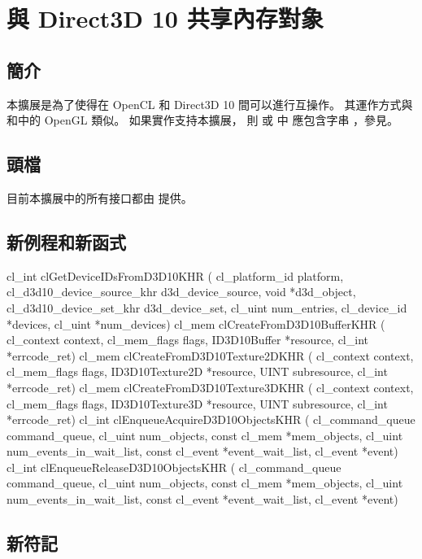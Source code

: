 \section{與 Direct3D 10 共享內存對象}

\subsection{簡介}

本擴展是為了使得在 OpenCL 和 Direct3D 10 間可以進行互操作。
其運作方式與\insection[clShareGl]和\insection[clEvtObjFromGlSync]中的 OpenGL 類似。
如果實作支持本擴展，
則  或  中
應包含字串 ，參見。

\subsection{頭檔}

目前本擴展中的所有接口都由  提供。

\subsection{新例程和新函式}

\startCLFUNC
cl_int clGetDeviceIDsFromD3D10KHR (
		cl_platform_id platform,
		cl_d3d10_device_source_khr d3d_device_source,
		void *d3d_object,
		cl_d3d10_device_set_khr d3d_device_set,
		cl_uint num_entries,
		cl_device_id *devices,
		cl_uint *num_devices)
cl_mem clCreateFromD3D10BufferKHR (
		cl_context context,
		cl_mem_flags flags,
		ID3D10Buffer *resource,
		cl_int *errcode_ret)
cl_mem clCreateFromD3D10Texture2DKHR (
		cl_context context,
		cl_mem_flags flags,
		ID3D10Texture2D *resource,
		UINT subresource,
		cl_int *errcode_ret)
cl_mem clCreateFromD3D10Texture3DKHR (
		cl_context context,
		cl_mem_flags flags,
		ID3D10Texture3D *resource,
		UINT subresource,
		cl_int *errcode_ret)
cl_int clEnqueueAcquireD3D10ObjectsKHR (
		cl_command_queue command_queue,
		cl_uint num_objects,
		const cl_mem *mem_objects,
		cl_uint num_events_in_wait_list,
		const cl_event *event_wait_list,
		cl_event *event)
cl_int clEnqueueReleaseD3D10ObjectsKHR (
		cl_command_queue command_queue,
		cl_uint num_objects,
		const cl_mem *mem_objects,
		cl_uint num_events_in_wait_list,
		const cl_event *event_wait_list,
		cl_event *event)
\stopCLFUNC

\subsection{新符記}

